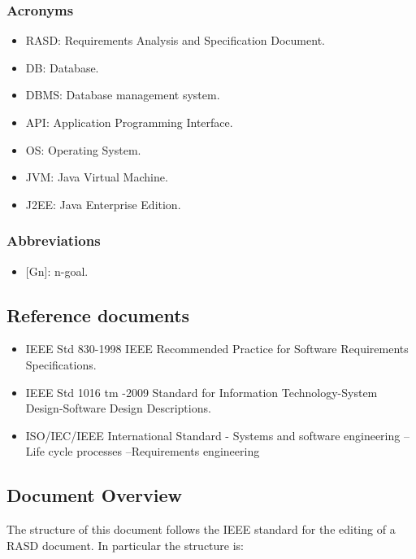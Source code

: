 \subsubsection{Acronyms}
\begin{itemize} 
	\item RASD: Requirements Analysis and Specification Document.
	\item DB: Database.
	\item DBMS: Database management system.
	\item API: Application Programming Interface.
	\item OS: Operating System.
	\item JVM: Java Virtual Machine.
	\item J2EE: Java Enterprise Edition.
\end{itemize}

\subsubsection{Abbreviations}
\begin{itemize}
	\item {[}Gn{]}: n-goal.
\end{itemize}


\subsection{Reference documents}
\begin{itemize}
	\item IEEE Std 830-1998 IEEE Recommended Practice for Software Requirements Specifications.
	\item IEEE Std 1016 tm -2009 Standard for Information Technology-System Design-Software Design Descriptions.
	\item ISO/IEC/IEEE International Standard - Systems and software engineering -- Life cycle processes --Requirements engineering
\end{itemize}

\subsection{Document Overview}
The structure of this document follows the IEEE standard for the editing of a RASD document. In particular the structure is:

